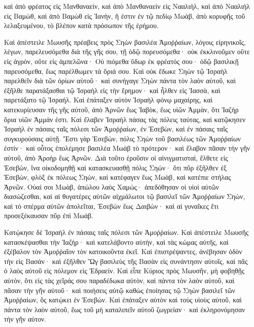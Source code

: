 {καὶ ἀπὸ φρέατος εἰς Μανθαναεὶν, καὶ ἀπὸ Μανθαναεὶν εἰς Νααλιὴλ, καὶ ἀπὸ Νααλιὴλ εἰς Βαμὼθ, καὶ ἀπὸ Βαμὼθ εἰς Ἰανὴν, ἥ ἐστιν ἐν τῷ πεδίῳ Μωὰβ, ἀπὸ κορυφῆς τοῦ λελαξευμένου, τὸ βλέπον κατὰ πρόσωπον τῆς ἐρήμου.
\par }{\PP {}Καὶ ἀπέστειλε Μωυσῆς πρέαβεις πρὸς Σηὼν βασιλέα Ἀμοῤῥαίων, λόγοις εἰρηνικοῖς, λέγων,
παρελευσόμεθα διὰ τῆς γῆς σου, τῇ ὁδῷ πορευσόμεθα· οὐκ ἐκκλινοῦμεν οὔτε εἰς ἀγρὸν, οὔτε εἰς ἀμπελῶνα·
Οὐ πιόμεθα ὕδωρ ἐκ φρέατός σου· ὁδῷ βασιλικῇ παρευσόμεθα, ἕως παρέλθωμεν τὰ ὅριά σου.
Καὶ οὐκ ἔδωκε Σηὼν τῷ Ἰσραὴλ παρελθεῖν διὰ τῶν ὁρίων αὐτοῦ· καὶ συνήγαγε Σηὼν πάντα τὸν λαὸν αὐτοῦ, καὶ ἐξῆλθε παρατάξασθαι τῷ Ἰσραὴλ εἰς τὴν ἔρημον· καὶ ἦλθεν εἰς Ἰασσὰ, καὶ παρετάξατο τῷ Ἰσραήλ.
Καὶ ἐπάταξεν αὐτὸν Ἰσραὴλ φόνῳ μαχαίρης, καὶ κατεκυρίευσαν τῆς γῆς αὐτοῦ, ἀπὸ Ἀρνῶν ἕως Ἰαβὸκ, ἕως υἱῶν Ἀμμὰν, ὅτι Ἰαζὴρ ὅρια υἱῶν Ἀμμάν ἐστι.
Καὶ ἔλαβεν Ἰσραὴλ πάσας τὰς πόλεις ταύτας, καὶ κατῷκησεν Ἰσραὴλ ἐν πάσαις ταῖς πόλεσι τῶν Ἀμοῤῥαίων, ἐν Ἑσεβὼν, καὶ ἐν πάσαις ταῖς συγκυρούσαις αὐτῇ.
Ἔστι γὰρ Ἐσεβὼν, πόλις Σηὼν τοῦ βασιλέως τῶν Ἀμοῤῥαίων ἐστίν· καὶ οὗτος ἐπολέμησε βασιλέα Μωὰβ τὸ πρότερον· καὶ ἔλαβον πᾶσαν τὴν γῆν αὐτοῦ, ἀπὸ Ἀροὴρ ἕως Ἀρνῶν.
Διὰ τοῦτο ἐροῦσιν οἱ αἰνιγματισταὶ, ἔλθετε εἰς Ἐσεβὼν, ἵνα οἰκοδομηθῇ καὶ κατασκευασθῇ πόλις Σηών·
ὅτι πῦρ ἐξῆλθεν ἐξ Ἑσεβὼν, φλὸξ ἐκ πόλεως Σηὼν, καὶ κατέφαγεν ἕως Μωὰβ, καὶ κατέπιε στήλας Ἀρνῶν.
Οὐαί σοι Μωὰβ, ἀπώλου λαὸς Χαμώς· ἀπεδόθησαν οἱ υἱοὶ αὐτῶν διασώζεσθαι, καὶ αἱ θυγατέρες αὐτῶν αἰχμάλωτοι τῷ βασιλεῖ τῶν Ἀμοῤῥαίων Σηὼν,
καὶ τὸ σπέρμα αὐτῶν ἀπολεῖται, Ἑσεβὼν ἕως Δαιβών· καὶ αἱ γυναῖκες ἔτι προσεξέκαυσαν πῦρ ἐπὶ Μωάβ.
\par }{\PP {}Κατῴκησε δὲ Ἰσραὴλ ἐν πάσαις ταῖς πόλεσι τῶν Ἀμοῤῥαίων.
Καὶ ἀπέστειλε Μωυσῆς κατασκέψασθαι τὴν Ἰαζήρ· καὶ κατελάβοντο αὐτὴν, καὶ τὰς κώμας αὐτῆς, καὶ ἐξέβαλον τὸν Ἀμοῤῥαῖον τὸν κατοικοῦντα ἐκεῖ.
Καὶ ἐπιστρέψαντες, ἀνέβησαν ὁδὸν τὴν εἰς Βασάν· καὶ ἐξῆλθεν Ὢγ βασιλεὺς τῆς Βασὰν εἰς συνάντησιν αὐτοῖς, καὶ πᾶς ὁ λαὸς αὐτοῦ εἰς πόλεμον εἰς Ἐδραείν.
Καὶ εἶπε Κύριος πρὸς Μωυσῆν, μὴ φοβηθῇς αὐτὸν, ὅτι εἰς τὰς χεῖράς σου παραδέδωκα αὐτὸν, καὶ πάντα τὸν λαὸν αὐτοῦ, καὶ πᾶσαν τὴν γῆν αὐτοῦ· καὶ ποιήσεις αὐτῷ καθὼς ἐποίησας τῷ Σηὼν βασιλεῖ τῶν Ἀμοῤῥαίων, ὃς κατῴκει ἐν Ἑσεβών.
Καὶ ἐπάταξεν αὐτὸν καὶ τοὺς υἱοὺς αὐτοῦ, καὶ πάντα τὸν λαὸν αὐτοῦ, ἕως τοῦ μὴ καταλιπεῖν αὐτοῦ ζωγρείαν· καὶ ἐκληρονόμησαν τὴν γῆν αὐτον.

}
